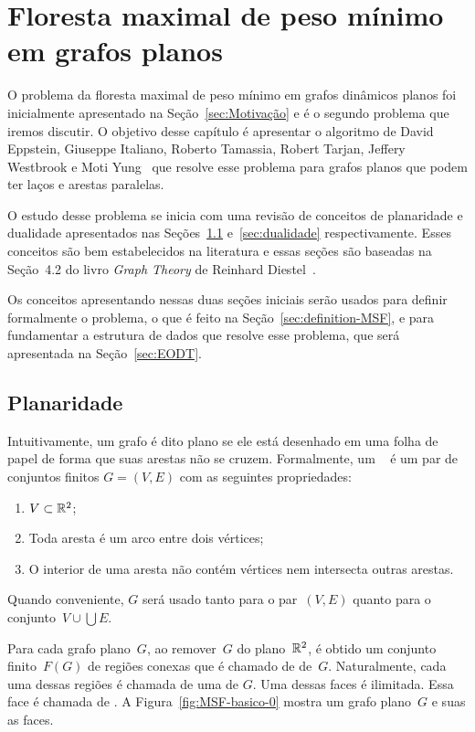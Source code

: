 \chapter{Floresta maximal de peso mínimo em grafos planos}
\label{sec:MSF}

O problema da floresta maximal de peso mínimo em grafos dinâmicos planos foi inicialmente apresentado na Seção~\ref{sec:Motivação} e é o segundo problema que iremos discutir.
O objetivo desse capítulo é apresentar o algoritmo de David Eppstein, Giuseppe Italiano, Roberto Tamassia, Robert Tarjan, Jeffery Westbrook e Moti Yung~\cite{EPPSTEIN-planar} que resolve esse problema para grafos planos que podem ter laços e arestas paralelas.

O estudo desse problema se inicia com uma revisão de conceitos de planaridade e dualidade apresentados nas Seções~\ref{sec:planaridade} e~\ref{sec:dualidade} respectivamente.
Esses conceitos são bem estabelecidos na literatura e essas seções são baseadas na Seção~4.2 do livro \textit{Graph Theory} de Reinhard Diestel~\cite{Diestel}.

Os conceitos apresentando nessas duas seções iniciais serão usados para definir formalmente o problema, o que é feito na Seção~\ref{sec:definition-MSF}, e para fundamentar a estrutura de dados que resolve esse problema, que será apresentada na Seção~\ref{sec:EODT}.

\section{Planaridade}
\label{sec:planaridade}

Intuitivamente, um grafo é dito plano se ele está desenhado em uma folha de papel de forma que suas arestas não se cruzem.
Formalmente, um ~\cite{Diestel} é um par de conjuntos finitos $G = (V, E)$ com as seguintes propriedades:
\begin{enumerate}
\item $V\subset \mathbb{R}^2$;
\item Toda aresta é um arco entre dois vértices;
\item O interior de uma aresta não contém vértices nem intersecta outras arestas.
\end{enumerate}
Quando conveniente, $G$ será usado tanto para o par~$(V ,E)$ quanto para o conjunto~${V\cup\bigcup E}$.

Para cada grafo plano~$G$, ao remover~$G$ do plano~$\mathbb{R}^2$, é obtido um conjunto finito~$F(G)$ de regiões conexas que é chamado de  de~$G$.
Naturalmente, cada uma dessas regiões é chamada de uma  de $G$.
Uma dessas faces é ilimitada.
Essa face é chamada de .
A Figura~\ref{fig:MSF-basico-0} mostra um grafo plano~$G$ e suas as faces.


